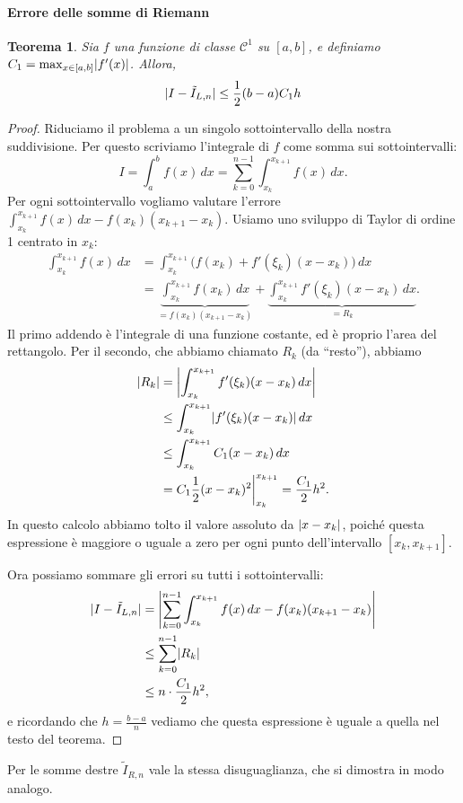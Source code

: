 \documentclass[a4paper]{report}
\DeclarePairedDelimiter{\abs}{\lvert}{\rvert}
\newtheorem{theorem}{Teorema}[chapter]
\theoremstyle{definiton}
\theoremstyle{remark}
\begin{document}
\paragraph{Errore delle somme di Riemann}
\begin{theorem}
Sia $f$ una funzione di classe $\mathcal{C}^1$ su $[a,b]$, e definiamo $C_1 = \max_{x\in [a,b]} \abs{f'(x)}$. Allora,
\begin{equation} \label{Riemann sum error}
    \abs{I - \tilde{I}_{L,n}} \leq \frac{1}{2} (b-a) C_1 h
\end{equation}
\end{theorem}
\begin{proof}
    Riduciamo il problema a un singolo sottointervallo della nostra suddivisione. Per questo scriviamo l'integrale di $f$ come somma sui sottointervalli:
    \[
    I = \int_a^b f(x)\, dx = \sum_{k=0}^{n-1} \int_{x_k}^{x_{k+1}}f(x)\, dx.
    \]
    Per ogni sottointervallo vogliamo valutare l'errore $\int_{x_k}^{x_{k+1}}f(x)\, dx - f(x_k)(x_{k+1}-x_k)$. Usiamo uno sviluppo di Taylor di ordine 1 centrato in $x_k$:
    \begin{align*}
    \int_{x_k}^{x_{k+1}}f(x)\, dx &= \int_{x_k}^{x_{k+1}} \biggl(f(x_k) + f'(\xi_k)(x - x_k) \biggr)\, dx\\
    &= \underbrace{\int_{x_k}^{x_{k+1}} f(x_k) \, dx}_{=f(x_k)(x_{k+1}-x_k)} + \underbrace{\int_{x_k}^{x_{k+1}}f'(\xi_k)(x - x_k)\, dx}_{=R_k}.
    \end{align*}
    Il primo addendo è l'integrale di una funzione costante, ed è proprio l'area del rettangolo. Per il secondo, che abbiamo chiamato $R_k$ (da ``resto''), abbiamo
    \begin{align*}
        \abs{R_k} &= \abs*{\int_{x_k}^{x_{k+1}}f'(\xi_k)(x - x_k)\, dx}\\
        & \leq \int_{x_k}^{x_{k+1}}\abs{f'(\xi_k)(x - x_k)}\, dx\\
        & \leq \int_{x_k}^{x_{k+1}} C_1 (x - x_k)\, dx\\
        &= C_1\frac{1}{2}(x-x_k)^2\bigg|_{x_k}^{x_{k+1}} = \frac{C_1}{2} h^2.
    \end{align*}
    In questo calcolo abbiamo tolto il valore assoluto da $\abs{x-x_k}$, poiché questa espressione è maggiore o uguale a zero per ogni punto dell'intervallo $[x_k,x_{k+1}]$.

    Ora possiamo sommare gli errori su tutti i sottointervalli:
    \begin{align*}
        \abs{I - \tilde{I}_{L,n}} &= \abs*{\sum_{k=0}^{n-1} \int_{x_k}^{x_{k+1}}f(x)\, dx - f(x_k)(x_{k+1}-x_k)}\\
        & \leq \sum_{k=0}^{n-1} \abs{R_k}\\
        & \leq n \cdot \frac{C_1}{2} h^2,
    \end{align*}
    e ricordando che $h = \frac{b-a}{n}$ vediamo che questa espressione è uguale a quella nel testo del teorema.
\end{proof}
Per le somme destre $\tilde{I}_{R,n}$ vale la stessa disuguaglianza, che si dimostra in modo analogo.
\end{document}
